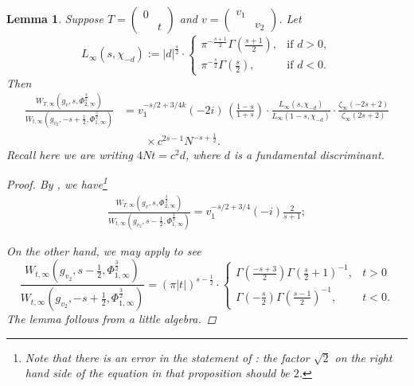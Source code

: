 \documentclass[reqno,oneside]{amsart}
\theoremstyle{plain}
\newtheorem{lemma}[theorem]{Lemma}
\theoremstyle{remark}
\numberwithin{theorem}{section}
\newcommand{\psm}[1]{\left( \begin{smallmatrix}#1 \end{smallmatrix} \right)}
\begin{document}
	\begin{lemma} \label{lem:Whittaker comparison arch}
		Suppose $T = \psm{ 0 & \\ & t}$ and $v = \psm{ v_1 & \\ & v_2}$. Let
		\begin{equation}
		L_{\infty}(s, \chi_{-d}) := |d|^{\frac{s}2} \cdot
		\begin{cases}
		\pi^{-\frac{s+1}{2}} \Gamma(\frac{s+1}2), & \text{if } d>0, \\
		\pi^{-\frac{s}{2}} \Gamma(\frac{s}2), & \text{if }  d< 0.
		\end{cases}
		\end{equation}
		Then
		\begin{equation}
		\begin{split}
		\frac{W_{T, \infty} \left(g_v, s, \Phi^{\frac32}_{2,\infty}\right)}{W_{t,\infty}\left(g_{v_2}, -s + \frac12, \Phi^{\frac32}_{1,\infty}\right)} &= v_1^{-s/2 + 3/4k} (-2i)  \,  \left( \frac{1-s}{1+s} \right) \cdot
		\frac{ L_{\infty}(s, \chi_{-d})}{L_{\infty}(1-s, \chi_{-d})} \cdot \frac{ \zeta_{\infty}(-2s + 2)}{\zeta_{\infty}(2s + 2) }  \\
		& \qquad \times c^{2s-1} N^{-s + \frac12}.
		\end{split}
		\end{equation}
		Recall here we are writing $4 N t = c^2 d$, where $d$ is a fundamental discriminant.
		
		\begin{proof}
			By \cite[Proposition 5.7.7]{KRYbook}, we have\footnote{Note that there is an error in the statement of \cite[Proposition 5.7.7]{KRYbook}: the factor $\sqrt 2$ on the right hand side of the equation in that proposition should be $2$.}
			\begin{align}
			\frac{W_{T, \infty} \left(g_v, s, \Phi^{\frac32}_{2,\infty}\right)}{W_{t,\infty}\left(g_{v_2}, s - \frac12, \Phi^{\frac32}_{1,\infty}\right)}  = v_1^{-s/2 + 3/4} (-i) \frac{{2} }{s+1};
			\end{align}
			
			
			On the other hand, we may apply \cite[Proposition 14.1]{KRYFaltings} to see
			\begin{equation}
			\frac{W_{t,\infty}\left(g_{v_2}, s - \frac12, \Phi^{\frac32}_{1,\infty}\right)}{W_{t,\infty}\left(g_{v_2}, -s +\frac12, \Phi^{\frac32}_{1,\infty}\right)} = (\pi|t|)^{s -\tfrac12} \cdot
			\begin{cases} \Gamma(\frac{-s + 3}2 ) \Gamma(\frac{s}2 + 1)^{-1}, & t>0 \\[10pt]
			\Gamma(-\frac{s}2) \Gamma(\frac{s-1}2)^{-1}, & t < 0.
			\end{cases}
			\end{equation}
			The lemma follows from a little algebra.
		\end{proof}
	\end{lemma}
	
\end{document}
